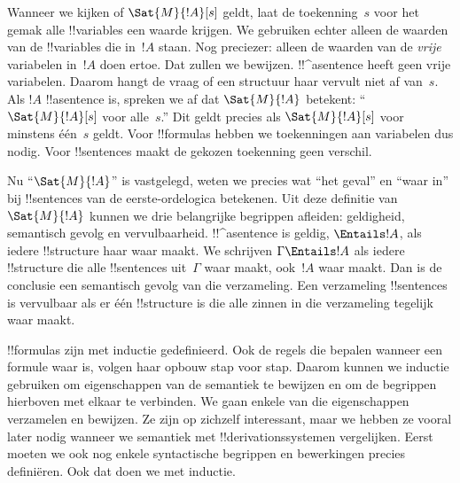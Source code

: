 \documentclass[../../../include/open-logic-section]{subfiles}
\begin{document}


Wanneer we kijken of $\Sat{M}{!A}[s]$ geldt, laat de toekenning~$s$
voor het gemak alle !!{variable}s een waarde krijgen. We gebruiken
echter alleen de waarden van de !!{variable}s die in~$!A$ staan. Nog
preciezer: alleen de waarden van de \emph{vrije} variabelen in~$!A$
doen ertoe. Dat zullen we bewijzen. !!^a{sentence} heeft geen vrije
variabelen. Daarom hangt de vraag of een structuur haar vervult niet
af van~$s$. Als $!A$ !!a{sentence} is, spreken we af dat
$\Sat{M}{!A}$ betekent: ``$\Sat{M}{!A}[s]$ voor alle~$s$.'' Dit geldt
precies als $\Sat{M}{!A}[s]$ voor minstens één~$s$ geldt. Voor
!!{formula}s hebben we toekenningen aan variabelen dus nodig. Voor
!!{sentence}s maakt de gekozen toekenning geen verschil.

Nu ``$\Sat{M}{!A}$'' is vastgelegd, weten we precies wat ``het geval''
en ``waar in'' bij !!{sentence}s van de eerste-ordelogica betekenen.
Uit deze definitie van $\Sat{M}{!A}$ kunnen we drie belangrijke
begrippen afleiden: geldigheid, semantisch gevolg en vervulbaarheid. !!^a{sentence} is geldig,
$\Entails !A$, als iedere !!{structure} haar waar maakt. We schrijven
$\Gamma \Entails !A$ als iedere !!{structure} die alle !!{sentence}s
uit~$\Gamma$ waar maakt, ook~$!A$ waar maakt. Dan is de conclusie een
semantisch gevolg van die verzameling. Een verzameling !!{sentence}s is
vervulbaar als er één !!{structure} is die alle zinnen in die
verzameling tegelijk waar maakt.

!!{formula}s zijn met inductie gedefinieerd. Ook de regels die bepalen
wanneer een formule waar is, volgen haar opbouw stap voor stap. Daarom
kunnen we inductie gebruiken om eigenschappen van de semantiek te
bewijzen en om de begrippen hierboven met elkaar te verbinden. We gaan
enkele van die eigenschappen verzamelen en bewijzen. Ze zijn op zichzelf interessant,
maar we hebben ze vooral later nodig wanneer we semantiek met
!!{derivation}ssystemen vergelijken. Eerst moeten we ook nog enkele
syntactische begrippen en bewerkingen precies definiëren. Ook dat doen
we met inductie.
\end{document}
